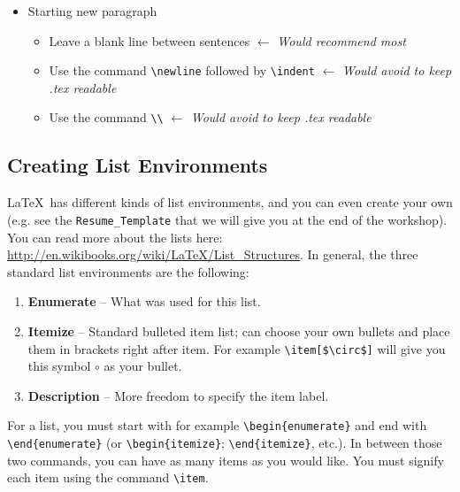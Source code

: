 \documentclass[]{article}%
\newcommand{\bs}{\textbackslash}
\newcommand{\TT}[1]{\texttt{#1}}
\newcommand{\tpc}{\textperiodcentered}
\theoremstyle{definition}
\begin{document}
\begin{itemize}
\begin{itemize}
		\end{itemize} 
		\item Starting new paragraph
		\begin{itemize}
			\item Leave a blank line between sentences $\leftarrow$ \emph{Would recommend most}
			\item Use the command \TT{\bs newline} followed by \TT{\bs indent} $\leftarrow$ \emph{Would avoid to keep .tex readable}
			\item Use the command \TT{\bs \bs} $\leftarrow$ \emph{Would avoid to keep .tex readable}
		\end{itemize}
	\end{itemize}
	
	\subsection{Creating List Environments}
	\LaTeX\ has different kinds of list environments, and you can even create your own (e.g. see the \TT{Resume\_Template} that we will give you at the end of the workshop).
	You can read more about the lists here: \url{http://en.wikibooks.org/wiki/LaTeX/List_Structures}.
	In general, the three standard list environments are the following:
	\begin{enumerate}
		\item \textbf{Enumerate} -- What was used for this list.
		\item \textbf{Itemize} -- Standard bulleted item list; can choose your own bullets and place them in brackets right after item.
		For example \TT{\bs item[\$\bs circ\$]} will give you this symbol $\circ$ as your bullet.
		\item \textbf{Description} -- More freedom to specify the item label.
	\end{enumerate}
	For a list, you must start with for example \TT{\bs begin\{enumerate\}} and end with \TT{\bs end\{enumerate\}} (or  \TT{\bs begin\{itemize\}}; \TT{\bs end\{itemize\}}, etc.).
	In between those two commands, you can have as many items as you would like.
	You must signify each item using the command \TT{\bs item}.
	
\end{document}
